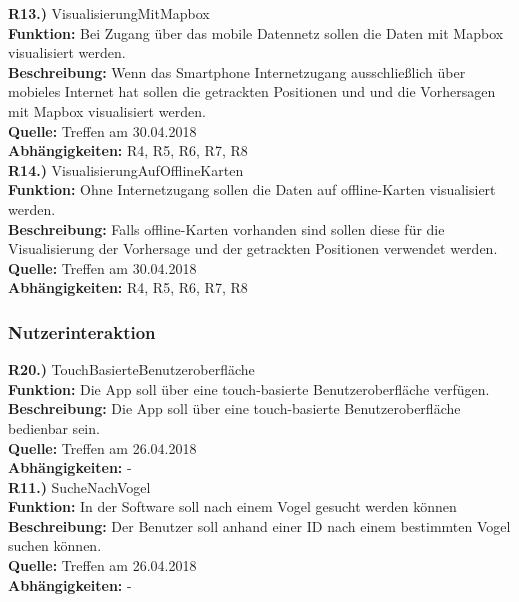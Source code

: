 \documentclass[12pt]{article} %
\begin{document}
\textbf{R13.)} VisualisierungMitMapbox\\
\textbf{Funktion:} Bei Zugang über das mobile Datennetz sollen die Daten mit Mapbox visualisiert werden.\\
\textbf{Beschreibung:} Wenn das Smartphone Internetzugang ausschließlich über mobieles Internet hat sollen die getrackten Positionen und und die Vorhersagen mit Mapbox visualisiert werden.\\
\textbf{Quelle:} Treffen am 30.04.2018\\
\textbf{Abhängigkeiten:} R4, R5, R6, R7, R8\\


\textbf{R14.)} VisualisierungAufOfflineKarten\\
\textbf{Funktion:} Ohne Internetzugang sollen die Daten auf offline-Karten visualisiert werden.\\
\textbf{Beschreibung:} Falls offline-Karten vorhanden sind sollen diese für die Visualisierung der Vorhersage und der getrackten Positionen verwendet werden. \\
\textbf{Quelle:} Treffen am 30.04.2018\\
\textbf{Abhängigkeiten:} R4, R5, R6, R7, R8\\


\subsubsection{Nutzerinteraktion}

\textbf{R20.)} TouchBasierteBenutzeroberfläche \\
\textbf{Funktion:} Die App soll über eine touch-basierte Benutzeroberfläche verfügen. \\
\textbf{Beschreibung:} Die App soll über eine touch-basierte Benutzeroberfläche bedienbar sein. \\
\textbf{Quelle:} Treffen am 26.04.2018 \\
\textbf{Abhängigkeiten:} - \\

\textbf{R11.)} SucheNachVogel\\
\textbf{Funktion:} In der Software soll nach einem Vogel gesucht werden können\\
\textbf{Beschreibung:} Der Benutzer soll anhand einer ID nach einem bestimmten Vogel suchen können.\\
\textbf{Quelle:} Treffen am 26.04.2018\\
\textbf{Abhängigkeiten:} -\\
\end{document}
